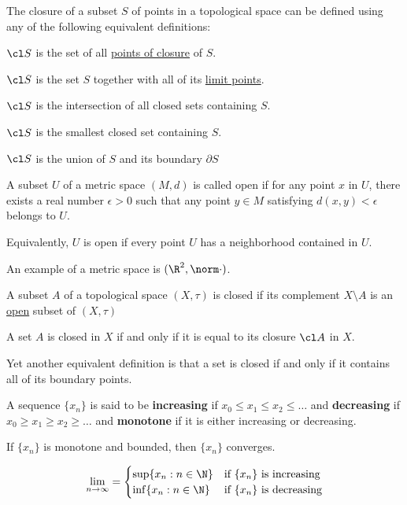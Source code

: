 \label{a07ff74}

The closure of a subset $S$ of points in a topological space can be defined
using any of the following equivalent definitions:
\begin{enumerati}
  \item $\cl S$ is the set of all \href{f928932}{points of closure} of $S$.
  \item $\cl S$ is the set $S$ together with all of its \href{f928932}{limit
  points}.
  \item $\cl S$ is the intersection of all closed sets containing $S$.
  \item $\cl S$ is the smallest closed set containing $S$.
  \item $\cl S$ is the union of $S$ and its boundary $\partial S$
\end{enumerati}

\label{dd04b4d}

A subset $U$ of a metric space $(M,d)$ is called open if for any point $x$ in
$U$, there exists a real number $\epsilon>0$ such that any point $y\in M$
satisfying $d(x,y)<\epsilon$ belongs to $U$.

Equivalently, $U$ is open if every point $U$ has a neighborhood contained in
$U$.

An example of a metric space is $(\R^2,\norm\cdot)$.

\label{deadb92}

A subset $A$ of a topological space $(X,\tau)$ is closed if its complement
$X\setminus A$ is an \href{dd04b4d}{open} subset of $(X,\tau)$

A set $A$ is closed in $X$ if and only if it is equal to its closure $\cl A$ in
$X$.

Yet another equivalent definition is that a set is closed if and only if it
contains all of its boundary points.

\label{b5fad69}

A sequence $\{x_n\}$ is said to be \textbf{increasing} if $x_0\leq x_1\leq
x_2\leq\ldots$ and \textbf{decreasing} if $x_0\geq x_1\geq x_2\geq\ldots$ and
\textbf{monotone} if it is either increasing or decreasing.

\label{ca25eb7}

If $\{x_n\}$ is monotone and bounded, then $\{x_n\}$ converges.

$$
  \lim_{n\to\infty}=\begin{cases}
    \sup\{x_n:n\in\N\} & \text{if $\{x_n\}$ is increasing} \\
    \inf\{x_n:n\in\N\} & \text{if $\{x_n\}$ is decreasing}
  \end{cases}
$$

